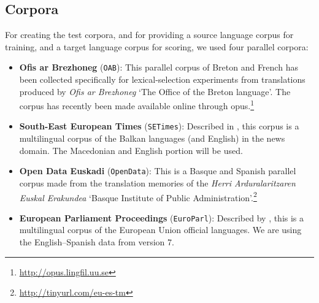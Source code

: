 \documentclass[11pt]{article}
\begin{document}
\subsection{Corpora}
\label{sec:eval-corpus}

For creating the test corpora, and for providing a source language corpus 
for training, and a target language corpus for scoring, we used four parallel corpora: 
\begin{itemize}
\addtolength{\itemsep}{-0.10in}
\item \textbf{Ofis ar Brezhoneg} (\texttt{OAB}): This parallel corpus
  of Breton and French has been collected specifically for
  lexical-selection experiments from translations produced by
  \emph{Ofis ar Brezhoneg} `The Office of the Breton
  language'. %
The corpus has recently been made available online through {\sc opus}.\footnote{\url{http://opus.lingfil.uu.se}}
\item \textbf{South-East European Times} (\texttt{SETimes}): Described
  in \cite{tyers10}, this corpus is a multilingual corpus of the
  Balkan languages (and English) in the news domain. The Macedonian and English
  portion will be used.
\item \textbf{Open Data Euskadi} (\texttt{OpenData}): This is a Basque
  and Spanish parallel corpus made from the translation memories of
  the \emph{Herri Arduralaritzaren Euskal Erakundea} `Basque Institute
  of Public
  Administration'.\footnote{\url{http://tinyurl.com/eu-es-tm}}
\item \textbf{European Parliament Proceedings} (\texttt{EuroParl}):
  Described by \cite{koehn05a}, this is a multilingual corpus of the
  European Union official languages. We are using the English--Spanish
  data from version 7.
\end{itemize}
\end{document}
